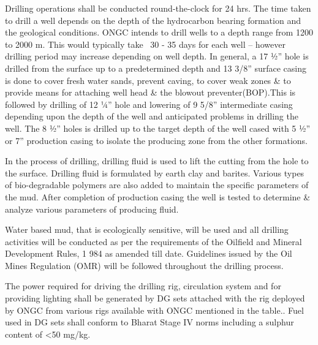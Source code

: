 Drilling operations shall be conducted round-the-clock for 24 hrs. The time taken to drill a
 well depends on the depth of the hydrocarbon bearing formation and the geological conditions.
 ONGC intends to drill wells to a depth range from 1200 to 2000 m. This would typically take ~30 - 35 days
  for each well – however drilling period may increase depending on well depth.
  In general, a 17 1⁄2” hole is drilled from the surface up to a predetermined depth and 13 3/8” surface casing is done to cover fresh water sands, prevent caving, to cover weak zones \& to provide means for attaching well head \& the blowout preventer(BOP).This is followed by drilling of 12 1⁄4” hole and lowering of 9 5/8” intermediate casing depending upon the depth of the well and anticipated problems in drilling the well. The 8 1⁄2” holes is drilled up to the target depth of the well cased with 5 1⁄2” or 7” production casing to isolate the producing zone from the other formations.

\vspace{1em}

In the process of drilling, drilling fluid is used to lift the cutting from the hole to the surface.
Drilling fluid is formulated by earth clay and barites. Various types of bio-degradable polymers are
also added to maintain the specific parameters of the mud. After completion of production casing
the well is tested to determine \& analyze various parameters of producing fluid.

\vspace{1em}

Water based mud, that is ecologically sensitive, will be used and all drilling activities will 
be conducted as per the requirements of the Oilfield and Mineral Development Rules, 1
984 as amended till date. Guidelines issued by the Oil Mines Regulation (OMR) will be followed 
throughout the drilling process.

\vspace{1em}
The power required for driving the drilling rig, circulation system and for providing lighting 
shall be generated by DG sets attached with the rig deployed by ONGC from various 
rigs available with ONGC mentioned in the table.. Fuel used in DG sets shall conform to 
Bharat Stage IV norms including a sulphur content of <50 mg/kg.


\newpage

